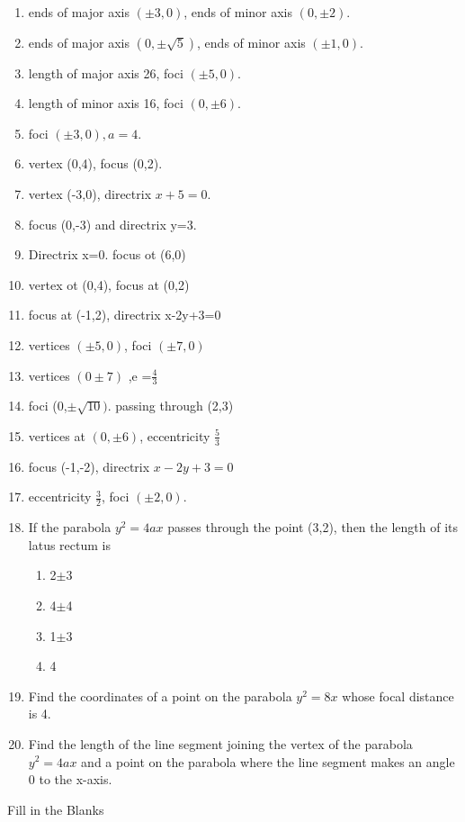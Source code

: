 \begin{enumerate}[label=\thesubsection.\arabic*,ref=\thesubsection.\theenumi,resume*]
\item ends of major axis $(\pm3,0)$, ends of minor axis $(0,\pm2)$.
\item ends of major axis $(0,\pm \sqrt{5})$, ends of minor axis $(\pm1,0)$.
\item length of major axis 26, foci $(\pm5,0)$.
\item length of minor axis 16, foci $(0,\pm6)$.
\item foci $(\pm3,0),a=4$.
\item vertex (0,4),  focus (0,2). 
\item vertex (-3,0),  directrix $x+5=0$.
\item focus (0,-3) and directrix y=3.
\item  Directrix x=0. focus ot (6,0)
\item  vertex  ot (0,4), focus at (0,2)
\item  focus at (-1,2), directrix x-2y+3=0
	 \item  vertices $(\pm5,0)$, foci $(\pm 7,0)$
	 \item vertices $(0\pm7)$ ,e =$\frac{4}{3}$ 
	 \item  foci (0,$\pm\sqrt{10})$. passing through (2,3)
\item vertices at $(0,\pm6)$,  eccentricity $\frac{5}{3}$
\item focus (-1,-2),  directrix $x-2y+3=0$ 
\item eccentricity $\frac{3}{2}$, foci $(\pm2,0)$.
\item If the parabola $y^2=4ax$ passes through the point (3,2), then the length of its latus rectum is
\begin{enumerate}
\item 2$\pm$3
\item 4$\pm$4
\item 1$\pm$3
\item 4
\end{enumerate}
 \item Find the coordinates of a point on the parabola $y^2=8x$ whose focal distance is 4.
 \item Find the length of the line segment joining the vertex of the parabola $y^2=4ax$ and a point on the parabola where the line segment makes an angle 0 to the x-axis.
\end{enumerate}
Fill in the Blanks
